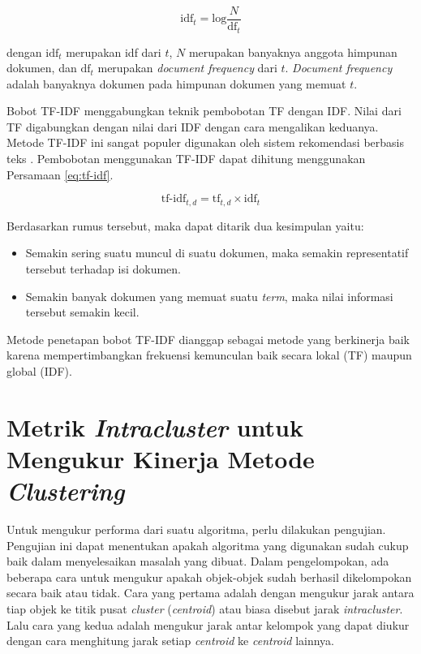 \begin{equation}
	\label{eq:idf}
	\textrm{idf}_t = \textrm{log} \frac{N}{\textrm{df}_t}
\end{equation}

dengan $\textrm{idf}_t$ merupakan idf dari \term $t$, $N$ merupakan banyaknya anggota himpunan dokumen, dan $\textrm{df}_t$ merupakan \textit{document frequency} dari \term $t$. \textit{Document frequency} adalah banyaknya dokumen pada himpunan dokumen yang memuat \term $t$.

Bobot TF-IDF menggabungkan teknik pembobotan TF dengan IDF. Nilai dari TF digabungkan dengan nilai dari IDF dengan cara mengalikan keduanya. Metode TF-IDF ini sangat populer digunakan oleh sistem rekomendasi berbasis teks \cite{aizawa2003information}. Pembobotan menggunakan TF-IDF dapat dihitung menggunakan Persamaan \ref{eq:tf-idf}.

\begin{equation}
	\label{eq:tf-idf}
	\textrm{tf-idf}_{t,d} = \textrm{tf}_{t,d} \times \textrm{idf}_t
\end{equation}

Berdasarkan rumus tersebut, maka dapat ditarik dua kesimpulan yaitu:
\begin{itemize}
	\item Semakin sering suatu \term muncul di suatu dokumen, maka semakin representatif \term tersebut terhadap isi dokumen.
	\item Semakin banyak dokumen yang memuat suatu \textit{term}, maka nilai informasi \term tersebut semakin kecil. %
\end{itemize}

Metode penetapan bobot TF-IDF dianggap sebagai metode yang berkinerja baik karena mempertimbangkan frekuensi kemunculan \term baik secara lokal (TF) maupun global (IDF).

\section{Metrik \textit{Intracluster} untuk Mengukur Kinerja Metode \textit{Clustering}}
\label{sec:metric}
Untuk mengukur performa dari suatu algoritma, perlu dilakukan pengujian. Pengujian ini dapat menentukan apakah algoritma yang digunakan sudah cukup baik dalam menyelesaikan masalah yang dibuat. Dalam pengelompokan, ada beberapa cara untuk mengukur apakah objek-objek sudah berhasil dikelompokan secara baik atau tidak. Cara yang pertama adalah dengan mengukur jarak antara tiap objek ke titik pusat \textit{cluster} (\textit{centroid}) atau biasa disebut jarak \textit{intracluster}. Lalu cara yang kedua adalah mengukur jarak antar kelompok yang dapat diukur dengan cara menghitung jarak setiap \textit{centroid} ke \textit{centroid} lainnya.

